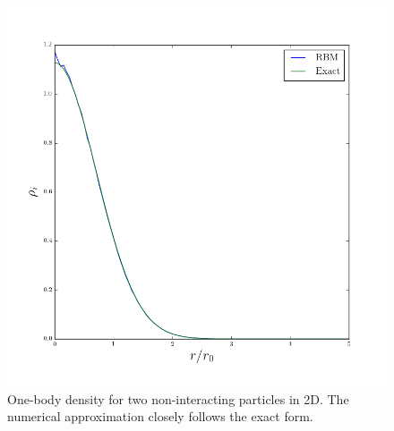 \documentclass[a4paper, 11pt]{article}
\begin{document}
\begin{figure}[ht]
    \centering
    \includegraphics[width=0.8\linewidth]{../results/P2-D2-onebody.png}
    \caption{One-body density for two non-interacting particles in 2D. The
    numerical approximation closely follows the exact form.}
    \label{fig:rbm-onebody-ideal}
\end{figure}

\begin{multicols}{2}
    \printbibliography
\end{multicols}
\end{document}
